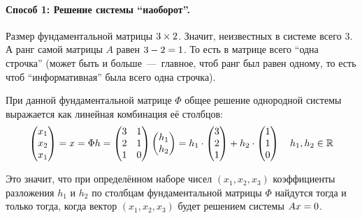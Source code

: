 \documentclass[a4paper,12pt]{article}
\begin{document}
  \begin{solution}
    \hphantom{X}\par  %
    
    \paragraph{Способ 1: Решение системы ``наоборот''.}
    
    Размер фундаментальной матрицы $3 \hm\times 2$.
    Значит, неизвестных в системе всего $3$.
    А ранг самой матрицы $A$ равен $3 \hm- 2 \hm= 1$.
    То есть в матрице всего ``одна строчка'' (может быть и больше~---~главное, чтоб ранг был равен одному, то есть чтоб ``информативная'' была всего одна строчка).
    
    При данной фундаментальной матрице $\Phi$ общее решение однородной системы выражается как линейная комбинация её столбцов:
    \begin{equation*}
    \begin{split}
      \begin{pmatrix} x_1 \\ x_2 \\ x_1 \end{pmatrix}
      = x = \Phi h = \begin{pmatrix}
          3 & 1\\
          2 & 1\\
          1 & 0
        \end{pmatrix} \begin{pmatrix}
          h_1 \\ h_2
        \end{pmatrix}
      = h_1 \cdot \begin{pmatrix} 3 \\ 2 \\ 1 \end{pmatrix} +
         h_2 \cdot \begin{pmatrix} 1 \\ 1 \\ 0 \end{pmatrix} \quad h_1, h_2 \in \operatorname{\mathbb R}
    \end{split}
    \end{equation*}
    
    Это значит, что при определённом наборе чисел $(x_1, x_2, x_3)$ коэффициенты разложения $h_1$ и $h_2$ по столбцам фундаментальной матрицы $\Phi$ найдутся тогда и только тогда, когда вектор $(x_1, x_2, x_3)$ будет решением системы $A x \hm= 0$.
    

\end{solution}
\end{document}
